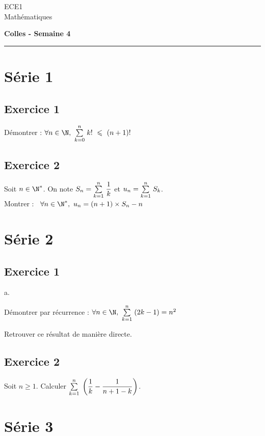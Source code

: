 \documentclass[11pt]{article}%
\begin{document}
\begin{flushleft}
ECE1 \\
Mathématiques
\end{flushleft}

\begin{center}
\textbf{\Large{Colles - Semaine 4}}
\end{center}

\hrule

\vspace*{0,2cm}

\section{Série 1}

\subsection*{Exercice 1}
\noindent
Démontrer : $\forall n \in \N, \ \Sum{k=0}{n} k! \ \leq \ (n+1)!$

\subsection*{Exercice 2}
\noindent
Soit $n \in \N^*$. On note $S_n = {\textstyle\sum\limits_{k=1}^{n}}\hspace{.1cm} \dfrac{1}{k}$ et $u_n
  = {\textstyle\sum\limits_{k=1}^{n}}\hspace{.1cm} S_k$.\\[.2cm]
  Montrer : \ $\forall n \in \N^*, \ u_n = (n+1) \times S_n - n$


\section{Série 2}
\subsection*{Exercice 1}
\noindent
  \begin{noliste}{a.}
  \item Démontrer par récurrence : $\forall n \in \N, \
    \Sum{k=1}{n} (2k-1) = n^2$
  \item Retrouver ce résultat de manière directe.
  \end{noliste}


\subsection*{Exercice 2}
\noindent
  Soit $n\geq 1$. Calculer ${\textstyle\sum\limits_{k=1}^{n}}\hspace{.1cm} \left( \dfrac{1}{k} -
    \dfrac{1}{n+1-k} \right)$.

\section{Série 3}
\end{document}
